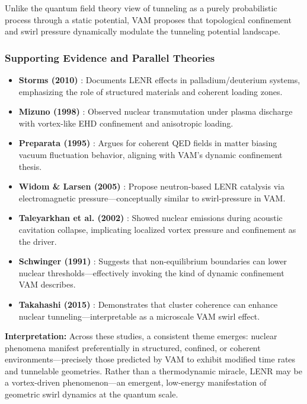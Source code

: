 Unlike the quantum field theory view of tunneling as a purely probabilistic process through a static potential, VAM proposes that topological confinement and swirl pressure dynamically modulate the tunneling potential landscape.

\subsubsection{Supporting Evidence and Parallel Theories}

\begin{itemize}
    \item \textbf{Storms (2010)} \cite{storms2010}: Documents LENR effects in palladium/deuterium systems, emphasizing the role of structured materials and coherent loading zones.

    \item \textbf{Mizuno (1998)} \cite{mizuno1998}: Observed nuclear transmutation under plasma discharge with vortex-like EHD confinement and anisotropic loading.

    \item \textbf{Preparata (1995)} \cite{preparata1995}: Argues for coherent QED fields in matter biasing vacuum fluctuation behavior, aligning with VAM's dynamic confinement thesis.

    \item \textbf{Widom \& Larsen (2005)} \cite{widom2005}: Propose neutron-based LENR catalysis via electromagnetic pressure---conceptually similar to swirl-pressure in VAM.

    \item \textbf{Taleyarkhan et al. (2002)} \cite{taleyarkhan2002}: Showed nuclear emissions during acoustic cavitation collapse, implicating localized vortex pressure and confinement as the driver.

    \item \textbf{Schwinger (1991)} \cite{schwinger1991}: Suggests that non-equilibrium boundaries can lower nuclear thresholds---effectively invoking the kind of dynamic confinement VAM describes.

    \item \textbf{Takahashi (2015)} \cite{takahashi2015}: Demonstrates that cluster coherence can enhance nuclear tunneling---interpretable as a microscale VAM swirl effect.
\end{itemize}

\textbf{Interpretation:} Across these studies, a consistent theme emerges: nuclear phenomena manifest preferentially in structured, confined, or coherent environments---precisely those predicted by VAM to exhibit modified time rates and tunnelable geometries. Rather than a thermodynamic miracle, LENR may be a vortex-driven phenomenon—an emergent, low-energy manifestation of geometric swirl dynamics at the quantum scale.